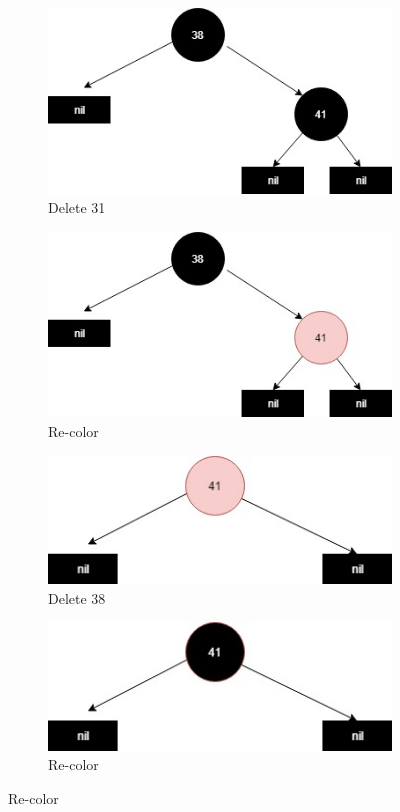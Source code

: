 \documentclass[20pt]{article} %
\begin{document}
\begin{figure}[!htbp]
   	\begin{subfigure}[p]{0.4\linewidth}
    	\includegraphics[width=\linewidth]{a5-1.jpg}
     	\caption{Delete 31}
   	\end{subfigure}
  	\begin{subfigure}[p]{0.4\linewidth}
    	\includegraphics[width=\linewidth]{a5-2.jpg}
    	\caption{Re-color}
  	\end{subfigure}

   	\begin{subfigure}[p]{0.4\linewidth}
    	\includegraphics[width=\linewidth]{a6-1.jpg}
     	\caption{Delete 38}
   	\end{subfigure}
  	\begin{subfigure}[p]{0.4\linewidth}
    	\includegraphics[width=\linewidth]{a6-2.jpg}
    	\caption{Re-color}
  	\end{subfigure}


\end{figure}
\end{document}
